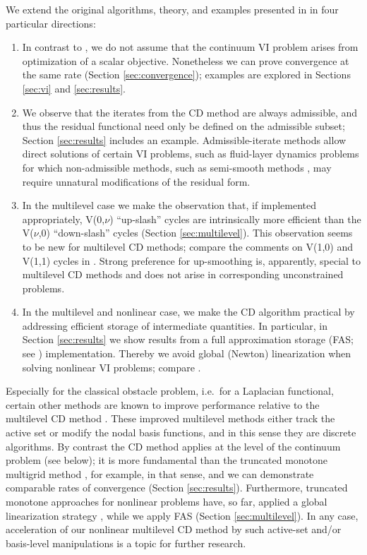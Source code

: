 \documentclass[letterpaper,final,12pt,reqno]{amsart}
\theoremstyle{cstyle}
\theoremstyle{cstyle*}
\theoremstyle{dstyle}
\numberwithin{equation}{section}
\numberwithin{figure}{section}
\numberwithin{table}{section}
\numberwithin{theorem}{section}
\begin{document}
We extend the original algorithms, theory, and examples presented in \cite{Tai2003} in four particular directions:
\renewcommand{\labelenumi}{\emph{(\roman{enumi})}}
\begin{enumerate}
\item In contrast to \cite{Tai2003}, we do not assume that the continuum VI problem arises from optimization of a scalar objective.  Nonetheless we can prove convergence at the same rate (Section \ref{sec:convergence}); %
examples are explored in Sections \ref{sec:vi} and \ref{sec:results}.
\item We observe that the iterates from the CD method are always admissible, and thus the residual functional need only be defined on the admissible subset; Section \ref{sec:results} includes an example.  Admissible-iterate methods allow direct solutions of certain VI problems, such as fluid-layer dynamics problems \cite{Bueler2021conservation,JouvetBueler2012} for which non-admissible methods, such as semi-smooth methods \cite{BensonMunson2006}, may require unnatural modifications of the residual form.
\item In the multilevel case we make the observation that, if implemented appropriately, V(0,$\nu$) ``up-slash'' cycles are intrinsically more efficient than the V($\nu$,0) ``down-slash'' cycles (Section \ref{sec:multilevel}).  This observation seems to be new for multilevel CD methods; compare the comments on V(1,0) and V(1,1) cycles in \cite{GraeserKornhuber2009,Tai2003}.  Strong preference for up-smoothing is, apparently, special to multilevel CD methods and does not arise in corresponding unconstrained problems.
\item In the multilevel and nonlinear case, we make the CD algorithm practical by addressing efficient storage of intermediate quantities.  In particular, in Section \ref{sec:results} we show results from a full approximation storage (FAS; see \cite{Brandt1977}) implementation.  Thereby we avoid global (Newton) linearization when solving nonlinear VI problems; compare \cite{GraeserKornhuber2009}.
\end{enumerate}

Especially for the classical obstacle problem, i.e.~for a Laplacian functional, certain other methods are known to improve performance relative to the multilevel CD method \cite{GraeserKornhuber2009}.  These improved multilevel methods either track the active set or modify the nodal basis functions, and in this sense they are discrete algorithms.  By contrast the CD method applies at the level of the continuum problem (see below); it is more fundamental than the truncated monotone multigrid method \cite{Kornhuber1994}, for example, in that sense, and we can demonstrate comparable rates of convergence (Section \ref{sec:results}). %
Furthermore, truncated monotone approaches for nonlinear problems have, so far, applied a global linearization strategy \cite{GraeserKornhuber2009}, while we apply FAS (Section \ref{sec:multilevel}).  In any case, acceleration of our nonlinear multilevel CD method by such active-set and/or basis-level manipulations is a topic for further research.
\end{document}

